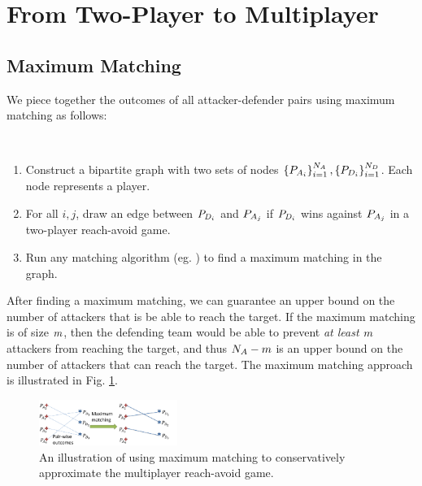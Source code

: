 \section{From Two-Player to Multiplayer} \label{sec:two_to_multi}

\subsection{Maximum Matching}
\label{subsec:max_match}
We piece together the outcomes of all attacker-defender pairs using maximum matching as follows:

\begin{alg}~
\begin{enumerate}
\item Construct a bipartite graph with two sets of nodes $\left\{P_{A_{i}}\right\}_{i=1}^{N_A},\left\{P_{D_{i}}\right\}_{i=1}^{N_D}$. Each node represents a player.
\item For all $i,j$, draw an edge between $P_{D_{i}}$ and $P_{A_{j}}$ if $P_{D_{i}}$ wins against $P_{A_{j}}$ in a two-player reach-avoid game.
\item Run any matching algorithm (eg. \cite{Schrjiver2004, Karpinski1998}) to find a maximum matching in the graph. %
\end{enumerate}
\end{alg}

After finding a maximum matching, we can guarantee an upper bound on the number of attackers that is be able to reach the target. If the maximum matching is of size $m$, then the defending team would be able to prevent \textit{at least} $m$ attackers from reaching the target, and thus $N_A-m$ is an upper bound on the number of attackers that can reach the target. The maximum matching approach is illustrated in Fig. \ref{fig:general_procedure}.

\begin{figure}
\centering
\includegraphics[width=0.4\textwidth]{"fig/general procedure"}
\caption{An illustration of using maximum matching to conservatively approximate the multiplayer reach-avoid game.}
\label{fig:general_procedure}
\end{figure}

